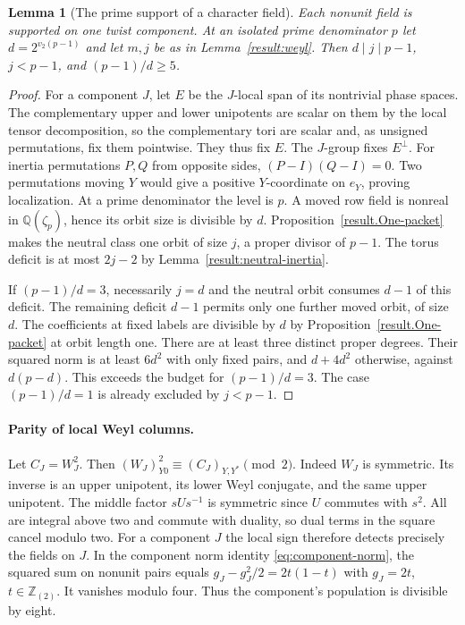 \documentclass[11pt]{amsart}
\numberwithin{equation}{section}
\newtheorem{lemma}[theorem]{Lemma}
\theoremstyle{definition}
\theoremstyle{plain}
\newcommand{\QQ}{\mathbb Q}
\newcommand{\ZZ}{\mathbb Z}
\begin{document}
\begin{lemma}[The prime support of a character field]\label{odd:field-component}
Each nonunit field is supported on one twist component. At an isolated
prime denominator $p$ let $d=2^{v_2(p-1)}$ and let $m,j$ be as
in Lemma~\ref{result:weyl}. Then $d\mid j\mid p-1$, $j<p-1$, and $(p-1)/d\ge5$.
\end{lemma}
\begin{proof}
For a component $J$, let $E$ be the $J$-local span of its nontrivial
phase spaces. The complementary upper and lower unipotents are scalar
on them by the local tensor decomposition, so the complementary tori
are scalar and, as unsigned permutations, fix them pointwise. They
thus fix $E$. The $J$-group fixes $E^\perp$. For inertia permutations
$P,Q$ from opposite sides, $(P-I)(Q-I)=0$. Two permutations moving
$Y$ would give a positive $Y$-coordinate on $e_Y$, proving localization.
At a prime denominator the level is $p$. A moved row field is nonreal
in $\QQ(\zeta_p)$, hence its orbit size is divisible by $d$.
Proposition~\ref{result.One-packet} makes the neutral class one orbit of size
$j$, a proper divisor of $p-1$. The torus deficit is at most $2j-2$ by Lemma~\ref{result:neutral-inertia}.

If $(p-1)/d=3$, necessarily $j=d$ and the neutral orbit consumes $d-1$ of this deficit. The remaining deficit $d-1$
permits only one further moved orbit, of size $d$. The coefficients
at fixed labels are divisible by $d$ by Proposition~\ref{result.One-packet} at orbit length one.
There are at least three distinct proper degrees. Their squared norm
is at least $6d^2$ with only fixed pairs, and $d+4d^2$ otherwise,
against $d(p-d)$. This exceeds the budget for $(p-1)/d=3$. The case $(p-1)/d=1$ is already excluded by $j<p-1$.
\end{proof}

\paragraph{Parity of local Weyl columns.}
Let $C_J=W_J^2$. Then $(W_J)_{Y0}^2\equiv(C_J)_{Y,Y^*}\pmod2$.
Indeed $W_J$ is symmetric. Its inverse is an upper unipotent, its
lower Weyl conjugate, and the same upper unipotent. The middle factor
$sUs^{-1}$ is symmetric since $U$ commutes with $s^2$.
All are integral above two and commute with duality, so dual terms in
the square cancel modulo two. For a component $J$ the local sign
therefore detects precisely the fields on $J$. In the component norm
identity \eqref{eq:component-norm}, the squared sum on nonunit pairs
equals $g_J-g_J^2/2=2t(1-t)$ with $g_J=2t$, $t\in\ZZ_{(2)}$. It
vanishes modulo four. Thus the component's population is divisible by eight.
\end{document}
